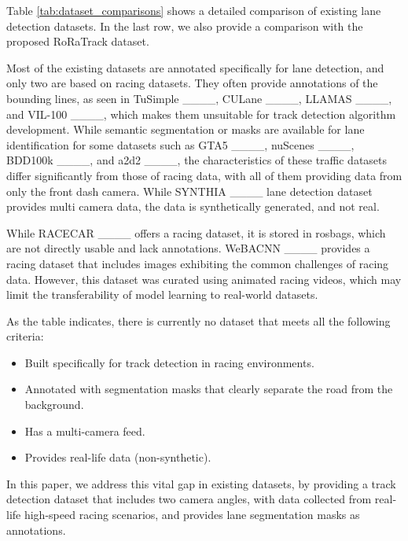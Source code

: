 Table \ref{tab:dataset_comparisons} shows a detailed comparison of existing lane detection datasets. In the last row, we also provide a comparison with the proposed RoRaTrack dataset. %

Most of the existing datasets are annotated specifically for lane detection, and only two are based on racing datasets. They often provide annotations of the bounding lines, as seen in TuSimple ____, CULane ____, LLAMAS ____, and VIL-100 ____, which makes them unsuitable for track detection algorithm development. While semantic segmentation or masks are available for lane identification for some datasets such as GTA5 ____, nuScenes ____, BDD100k ____, and a2d2 ____, the characteristics of these traffic datasets differ significantly from those of racing data, with all of them providing data from only the front dash camera. While SYNTHIA ____ lane detection dataset provides multi camera data, the data is synthetically generated, and not real.

While RACECAR ____ offers a racing dataset, it is stored in rosbags, which are not directly usable and lack annotations. WeBACNN ____ provides a racing dataset that includes images exhibiting the common challenges of racing data. However, this dataset was curated using animated racing videos, which may limit the transferability of model learning to real-world datasets. 

As the table indicates, there is currently no dataset that meets all the following criteria:
\begin{itemize}
    \item Built specifically for track detection in racing environments.
    \item Annotated with segmentation masks that clearly separate the road from the background.
    \item Has a multi-camera feed.
    \item Provides real-life data (non-synthetic).
\end{itemize}
In this paper, we address this vital gap in existing datasets, by providing a track detection dataset that includes two camera angles, with data collected from real-life high-speed racing scenarios, and provides lane segmentation masks as annotations.